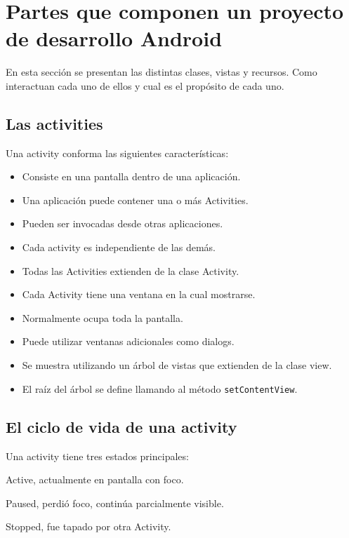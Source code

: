 \section{Partes que componen un proyecto de desarrollo Android}
\label{sec:dev.components}

En esta secci\'on se presentan las distintas clases, vistas y recursos. Como interactuan cada uno de ellos y cual es el prop\'osito de cada uno.

\subsection{Las activities}
\label{subsec:dev.activities}

Una activity conforma las siguientes caracter\'isticas:

\begin{itemize}
\item Consiste en una pantalla dentro de una aplicaci\'on.
\item Una aplicaci\'on puede contener una o m\'as Activities.
\item Pueden ser invocadas desde otras aplicaciones.
\item Cada activity es independiente de las dem\'as.
\item Todas las Activities extienden de la clase Activity.
\item Cada Activity tiene una ventana en la cual mostrarse.
\item Normalmente ocupa toda la pantalla.
\item Puede utilizar ventanas adicionales como dialogs.
\item Se muestra utilizando un \'arbol de vistas que extienden de la clase view.
\item El ra\'iz del \'arbol se define llamando al m\'etodo \texttt{setContentView}.
\end{itemize}

\subsection{El ciclo de vida de una activity}
\label{subsec:dev.activity.lifecycle}

Una activity tiene tres estados principales:

\begin{numerate}
\item Active, actualmente en pantalla con foco.
\item Paused, perdi\'o foco, contin\'ua parcialmente visible.
\item Stopped, fue tapado por otra Activity.
\end{numerate}

